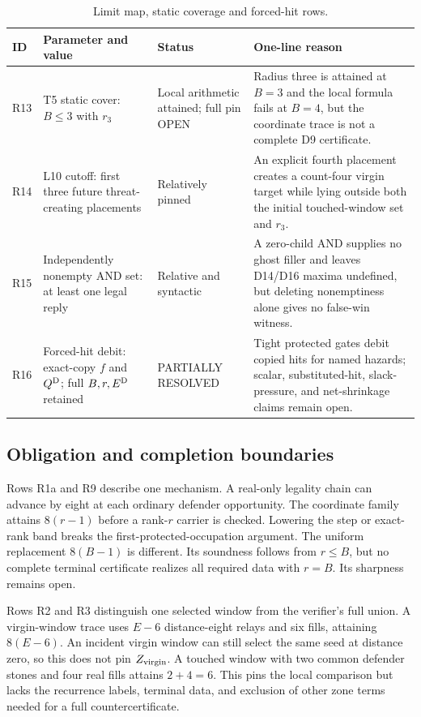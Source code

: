 \begin{table}[p]
  \centering
  \caption{Limit map, static coverage and forced-hit rows.}
  \label{tab:tightness-static}
  \scriptsize
  \renewcommand{\arraystretch}{1.12}
  \begin{tabular}{@{}p{}p{}p{}p{}@{}}
    \toprule
    ID & Parameter and value & Status & One-line reason \\
    \midrule
    R13 & T5 static cover: $B\le3$ with $r_3$ & Local arithmetic attained;
      full pin OPEN &
      Radius three is attained at $B=3$ and the local formula fails at $B=4$,
      but the coordinate trace is not a complete D9 certificate. \\
    R14 & L10 cutoff: first three future threat-creating placements &
      Relatively pinned &
      An explicit fourth placement creates a count-four virgin target while
      lying outside both the initial touched-window set and $r_3$. \\
    R15 & Independently nonempty AND set: at least one legal reply &
      Relative and syntactic &
      A zero-child AND supplies no ghost filler and leaves D14/D16 maxima
      undefined, but deleting nonemptiness alone gives no false-win witness. \\
    R16 & Forced-hit debit: exact-copy $f$ and $Q^{\mathrm{D}}$; full $B,r,E^{\mathrm{D}}$
      retained & PARTIALLY RESOLVED &
      Tight protected gates debit copied hits for named hazards; scalar,
      substituted-hit, slack-pressure, and net-shrinkage claims remain open. \\
    \bottomrule
  \end{tabular}
\end{table}

\subsection{Obligation and completion boundaries}

Rows R1a and R9 describe one mechanism.  A real-only legality chain can
advance by eight at each ordinary defender opportunity.  The coordinate
family attains $8(r-1)$ before a rank-$r$ carrier is checked.  Lowering the
step or exact-rank band breaks the first-protected-occupation argument.  The
uniform replacement $8(B-1)$ is different.  Its soundness follows from
$r\le B$, but no complete terminal certificate realizes all required data
with $r=B$.  Its sharpness remains open.

Rows R2 and R3 distinguish one selected window from the verifier's full
union.  A virgin-window trace uses $E-6$ distance-eight relays and six fills,
attaining $8(E-6)$.  An incident virgin window can still select the same seed
at distance zero, so this does not pin $Z_{\rm virgin}$.  A touched window
with two common defender stones and four real fills attains $2+4=6$.  This
pins the local comparison but lacks the recurrence labels, terminal data, and
exclusion of other zone terms needed for a full countercertificate.

